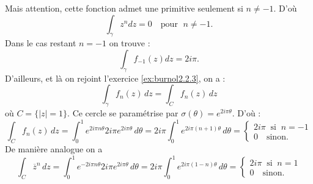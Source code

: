 {\begin{enumerate}
{Mais attention, cette fonction admet une primitive seulement si $n\neq -1$. D'o\`u
$$\int_\gamma z^n dz =0 \quad \text{pour } \; n\neq -1.$$
Dans le cas restant $n=-1$ on trouve :
$$\int_\gamma f_{-1}(z)dz =2i\pi.$$
D'ailleurs, et l\`a on rejoint l'exercice \ref{ex:burnol2.2.3}, on a :
$$\int_\gamma f_n(z)\, dz = \int_C f_n(z)\, dz $$
o\`u $C=\{ |z|=1\}$. Ce cercle se param\'etrise par $\sigma (\theta ) =e^{2i\pi \theta}$. D'o\`u :
$$\int_C f_n(z)\, dz=\int_0^1 e^{2i\pi n\theta} 2i\pi e^{2i\pi \theta} \, d\theta
=2i\pi \int_0^1 e^{2i\pi (n+1) \theta}\, d\theta =\left\{ \begin{array}{c}
                                                            2i\pi \;\; \text{si} \;\; n=-1 \\
                                                            0 \quad \text{sinon}.
                                                          \end{array}
\right.$$
De mani\`ere analogue on a
$$\int_C \overline{z}^n\, dz=\int_0^1 e^{-2i\pi n\theta} 2i\pi e^{2i\pi \theta} \, d\theta
=2i\pi \int_0^1 e^{2i\pi (1-n) \theta}\, d\theta =\left\{ \begin{array}{c}
                                                            2i\pi \;\; \text{si} \;\; n=1 \\
                                                            0 \quad \text{sinon.}
                                                          \end{array}
\right.$$
}
\end{enumerate}
}
